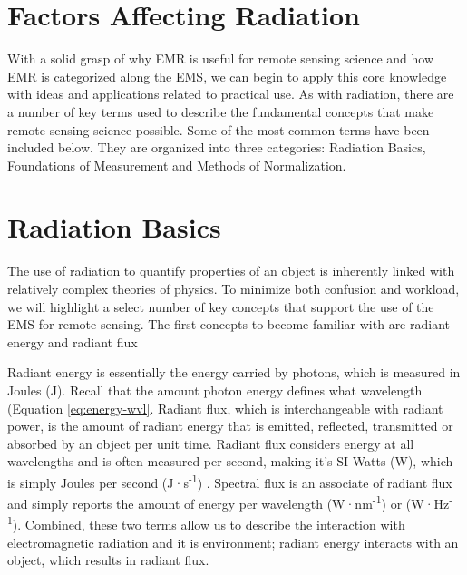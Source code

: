 \documentclass[
]{book}
\begin{document}
\hypertarget{factors-affecting-radiation}{%
\section{Factors Affecting Radiation}\label{factors-affecting-radiation}}

With a solid grasp of why EMR is useful for remote sensing science and
how EMR is categorized along the EMS, we can begin to apply this core
knowledge with ideas and applications related to practical use. As with
radiation, there are a number of key terms used to describe the
fundamental concepts that make remote sensing science possible. Some of
the most common terms have been included below. They are organized into
three categories: Radiation Basics, Foundations of Measurement and
Methods of Normalization.

\hypertarget{radiation-basics}{%
\section{\texorpdfstring{\textbf{Radiation Basics}}{Radiation Basics}}\label{radiation-basics}}

The use of radiation to quantify properties of an object is
inherently linked with relatively complex theories of physics. To
minimize both confusion and workload, we will highlight a select number
of key concepts that support the use of the EMS for remote sensing. The
first concepts to become familiar with are radiant energy and
radiant flux

Radiant energy is essentially the energy carried by photons,
which is measured in Joules (J). Recall that the amount photon
energy defines what wavelength (Equation \eqref{eq:energy-wvl}.
Radiant flux, which is interchangeable with radiant power, is the amount
of radiant energy that is emitted, reflected, transmitted or
absorbed by an object per unit time. Radiant flux considers energy
at all wavelengths and is often measured per second, making it's SI
Watts (W), which is simply Joules per second (J·s\textsuperscript{-1}) . Spectral flux is an
associate of radiant flux and simply reports the amount of energy
per wavelength (W·nm\textsuperscript{-1}) or (W·Hz\textsuperscript{-1}). Combined, these two terms allow us to
describe the interaction with electromagnetic radiation and it is
environment; radiant energy interacts with an object, which results
in radiant flux.
\end{document}
